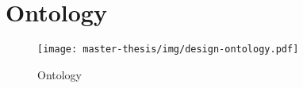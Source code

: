 \section{Ontology}
\begin{figure}[h]
  \centering
  \texttt{[image: master-thesis/img/design-ontology.pdf]}
  \caption{Ontology}
\end{figure}